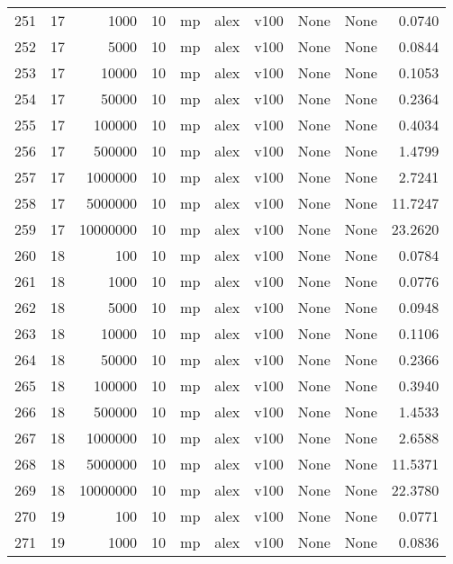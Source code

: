 \begin{tabular}{lrrrlllllr}
251 &  17 &      1000 &      10 &   mp &  alex &  v100 &  None &  None &   0.0740 \\
252 &  17 &      5000 &      10 &   mp &  alex &  v100 &  None &  None &   0.0844 \\
253 &  17 &     10000 &      10 &   mp &  alex &  v100 &  None &  None &   0.1053 \\
254 &  17 &     50000 &      10 &   mp &  alex &  v100 &  None &  None &   0.2364 \\
255 &  17 &    100000 &      10 &   mp &  alex &  v100 &  None &  None &   0.4034 \\
256 &  17 &    500000 &      10 &   mp &  alex &  v100 &  None &  None &   1.4799 \\
257 &  17 &   1000000 &      10 &   mp &  alex &  v100 &  None &  None &   2.7241 \\
258 &  17 &   5000000 &      10 &   mp &  alex &  v100 &  None &  None &  11.7247 \\
259 &  17 &  10000000 &      10 &   mp &  alex &  v100 &  None &  None &  23.2620 \\
260 &  18 &       100 &      10 &   mp &  alex &  v100 &  None &  None &   0.0784 \\
261 &  18 &      1000 &      10 &   mp &  alex &  v100 &  None &  None &   0.0776 \\
262 &  18 &      5000 &      10 &   mp &  alex &  v100 &  None &  None &   0.0948 \\
263 &  18 &     10000 &      10 &   mp &  alex &  v100 &  None &  None &   0.1106 \\
264 &  18 &     50000 &      10 &   mp &  alex &  v100 &  None &  None &   0.2366 \\
265 &  18 &    100000 &      10 &   mp &  alex &  v100 &  None &  None &   0.3940 \\
266 &  18 &    500000 &      10 &   mp &  alex &  v100 &  None &  None &   1.4533 \\
267 &  18 &   1000000 &      10 &   mp &  alex &  v100 &  None &  None &   2.6588 \\
268 &  18 &   5000000 &      10 &   mp &  alex &  v100 &  None &  None &  11.5371 \\
269 &  18 &  10000000 &      10 &   mp &  alex &  v100 &  None &  None &  22.3780 \\
270 &  19 &       100 &      10 &   mp &  alex &  v100 &  None &  None &   0.0771 \\
271 &  19 &      1000 &      10 &   mp &  alex &  v100 &  None &  None &   0.0836 \\

\end{tabular}
